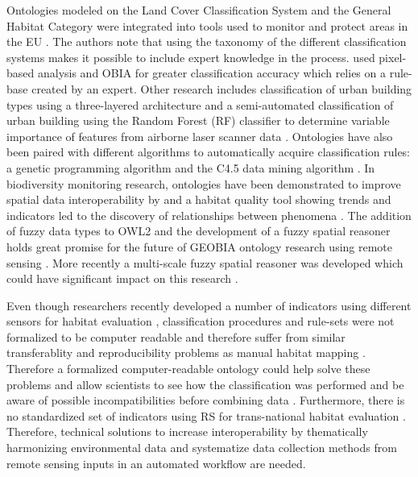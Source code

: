 \documentclass[authoryear, review,12pt,number]{elsarticle}
\begin{document}
Ontologies modeled on the Land Cover Classification System and the General
Habitat Category were integrated into tools used to monitor and protect areas in
the EU \citep{Arvor2013}. The authors note that using the taxonomy of the
different classification systems makes it possible to include expert knowledge
in the process. \cite{Lucas2015} used pixel-based analysis and OBIA for greater
classification accuracy which relies on a rule-base created by an expert. Other
research includes classification of urban building types using a three-layered
architecture \citep{diSciascio2013} and a semi-automated classification of urban
building using the Random Forest (RF) classifier to determine variable
importance of features from airborne laser scanner data \citep{Belgiu2014}.
Ontologies have also been paired with different algorithms to automatically
acquire classification rules: a genetic programming algorithm
\citep{Forestier2012470} and the C4.5 data mining algorithm
\citep{Sheeren2006ML}. In biodiversity monitoring research, ontologies have been
demonstrated to improve spatial data interoperability by \cite{Nieland2015} and
a habitat quality tool showing trends and indicators led to the discovery of
relationships between phenomena \citep{Perez-Luque2015}.  The addition of fuzzy
data types to OWL2 and the development of a fuzzy spatial reasoner holds great
promise for the future of GEOBIA ontology research using remote sensing
\citep{Bobillo2011, Bobillo2015}. More recently a multi-scale fuzzy spatial
reasoner was developed which could have significant impact on this research
\citep{Argyridis2015}.

Even though researchers recently developed a number of indicators using
different sensors for habitat evaluation \citep{Nagendra2013}, classification
procedures and rule-sets were not formalized to be computer readable and
therefore suffer from similar transferablity and reproducibility problems as
manual habitat mapping \citep{Arvor2013, Nieland2015}. Therefore a formalized
computer-readable ontology could help solve these problems and allow scientists
to see how the classification was performed and be aware of possible
incompatibilities before combining data \citep{Janowicz2012}.  Furthermore,
there is no standardized set of indicators using RS for trans-national habitat
evaluation \citep{Lucas2015, VandenBorre2011}. Therefore, technical solutions to
increase interoperability by thematically harmonizing environmental data and
systematize data collection methods from remote sensing inputs in an automated
workflow are needed. 
\end{document}
